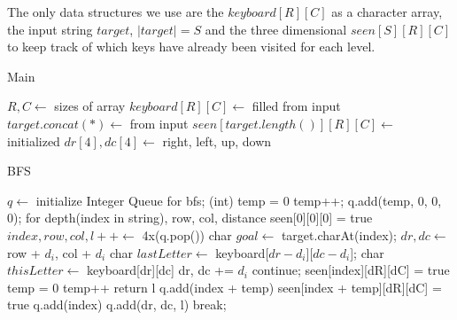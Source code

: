 \documentclass[12pt]{article}
\begin{document}
The only data structures we use are the $keyboard[R][C]$ as a character array, the input string $target$,
$|target| = S$ and the three dimensional $seen[S][R][C]$ to keep track of which keys have already been visited
for each level.

\begin{algorithm}[H]
\caption{Main}
\begin{algorithmic}
            \State $R, C \gets$ sizes of array
            \State $keyboard[R][C] \gets$ filled from input
            \State $target.concat(\ast) \gets$ from input
            \State $seen[target.length()][R][C] \gets$ initialized
            \State $dr[4], dc[4] \gets$ right, left, up, down
            \State {}
        \EndFor
    \EndProcedure
\end{algorithmic}
\end{algorithm}

\begin{algorithm}[H]
\caption{BFS}
\begin{algorithmic}
        \State $q \gets$ initialize Integer Queue for bfs; (int) temp = 0
            temp++;
        \EndWhile
        \State q.add(temp, 0, 0, 0); for depth(index in string), row, col, distance
        \State seen[0][0][0] = true
            \State $index, row, col, l++ \gets$ 4x(q.pop())
            \State char $goal \gets$ target.charAt(index);
                \State $dr, dc \gets$ row + $d_i$, col + $d_i$
                \State char $lastLetter \gets$ keyboard[$dr-d_i$][$dc-d_i$];
                    \State char $thisLetter \gets$ keyboard[dr][dc]
                        \State dr, dc += $d_i$
                        \State continue;
                    \EndIf
                        \State seen[index][dR][dC] = true
                            \State temp = 0
                                \State temp++
                                 return l
                                \EndIf
                                \State q.add(index + temp)
                                \State seen[index + temp][dR][dC] = true
                            \EndWhile
                        \Else
                            q.add(index)
                        \EndIf
                        \State q.add(dr, dc, l)
                    \EndIf
                    \State break;
                \EndWhile
            \EndFor
        \EndWhile
    \EndProcedure
\end{algorithmic}
\end{algorithm}
\end{document}
